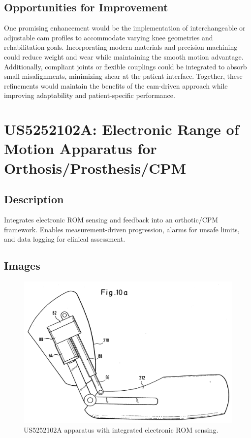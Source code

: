 \documentclass[11pt]{article}
\begin{document}
\subsection{Opportunities for Improvement}
One promising enhancement would be the implementation of interchangeable or adjustable cam profiles to accommodate varying knee geometries and rehabilitation goals. Incorporating modern materials and precision machining could reduce weight and wear while maintaining the smooth motion advantage. Additionally, compliant joints or flexible couplings could be integrated to absorb small misalignments, minimizing shear at the patient interface. Together, these refinements would maintain the benefits of the cam-driven approach while improving adaptability and patient-specific performance.

\section{US5252102A: Electronic Range of Motion Apparatus for Orthosis/Prosthesis/CPM}
\subsection{Description}
Integrates electronic ROM sensing and feedback into an orthotic/CPM framework. Enables measurement-driven progression, alarms for unsafe limits, and data logging for clinical assessment.
\subsection{Images}
\begin{figure}[H]
  \centering
  \includegraphics[width=0.54\linewidth]{US5252102_1.png}
  \caption{US5252102A apparatus with integrated electronic ROM sensing.}
  \label{fig:US5252102A}
\end{figure}
\end{document}
